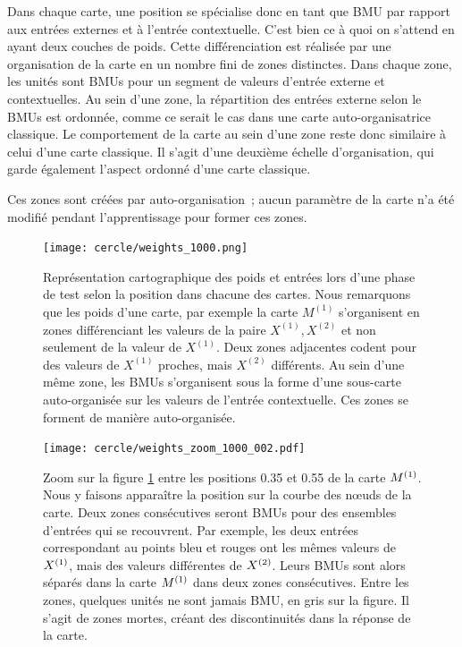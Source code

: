 \documentclass[../main]{subfiles}
\begin{document}
Dans chaque carte, une position se spécialise donc en tant que BMU par rapport aux entrées externes et à l'entrée contextuelle. C'est bien ce à quoi on s'attend en ayant deux couches de poids. 
Cette différenciation est réalisée par une organisation de la carte en un nombre fini de zones distinctes. Dans chaque zone, les unités sont BMUs pour un segment de valeurs d'entrée externe et contextuelles. Au sein d'une zone, la répartition des entrées externe selon le BMUs est ordonnée, comme ce serait le cas dans une carte auto-organisatrice classique. Le comportement de la carte au sein d'une zone reste donc similaire à celui d'une carte classique.
Il s'agit d'une deuxième échelle d'organisation, qui garde également l'aspect ordonné d'une carte classique. 

Ces zones sont créées par auto-organisation~; aucun paramètre de la carte n'a été modifié pendant l'apprentissage pour former ces zones.

\begin{figure}
	\centering\texttt{[image: cercle/weights\_1000.png]}
	\caption{Représentation cartographique des poids et entrées lors d'une phase de test selon la position dans chacune des cartes. Nous remarquons que les poids d'une carte, par exemple la carte $M^{(1)}$ s'organisent en zones différenciant les valeurs de la paire $X^{(1)}, X^{(2)}$ et non seulement de la valeur de $X^{(1)}$. Deux zones adjacentes codent pour des valeurs de $X^{(1)}$ proches, mais $X^{(2)}$ différents. Au sein d'une même zone, les BMUs s'organisent sous la forme d'une sous-carte auto-organisée sur les valeurs de l'entrée contextuelle. Ces zones se forment de manière auto-organisée. \label{fig:w}}
\end{figure}

\begin{figure}
	 \centering\texttt{[image: cercle/weights\_zoom\_1000\_002.pdf]}
	\caption{Zoom sur la figure \ref{fig:w} entre les positions 0.35 et 0.55 de la carte $M^{({1})}$. 
	Nous y faisons apparaître la position sur la courbe des n\oe{}uds de la carte.
	Deux zones consécutives seront BMUs pour des ensembles d'entrées qui se recouvrent. Par exemple, les deux entrées correspondant au points bleu et rouges ont les mêmes valeurs de $X^{({1})}$, mais des valeurs différentes de $X^{({2})}$. Leurs BMUs sont alors séparés dans la carte $M^{({1})}$ dans deux zones consécutives.
	Entre les zones, quelques unités ne sont jamais BMU, en gris sur la figure. Il s'agit de zones mortes, créant des discontinuités dans la réponse de la carte.
	\label{fig:w_zoom}}
\end{figure}
\end{document}
